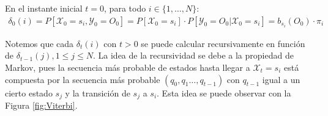 En el instante inicial $t=0$, para todo $i\in\{1,\dots,N\}$:
\[
\begin{aligned}
    \delta_0(i)=P[\mathcal{X}_0=s_i,\mathcal{Y}_0=O_0]=P[\mathcal{X}_0=s_i]\cdot P[\mathcal{Y}_0=O_0|\mathcal{X}_0=s_i]=b_{s_i}(O_0)\cdot\pi_i
\end{aligned}
\]

Notemos que cada $\delta_t(i)$ con $t>0$ se puede calcular recursivamente en función de $\delta_{t-1}(j),1\leq j\leq N$. La idea de la recursividad se debe a la propiedad de Markov, pues la secuencia más probable de estados hasta llegar a $\mathcal{X}_t=s_i$ está compuesta por la secuencia más probable $(q_0,q_1\dots,q_{t-1})$ con $q_{t-1}$ igual a un cierto estado $s_j$ y la transición de $s_j$ a $s_i$. Esta idea se puede observar con la Figura \ref{fig:Viterbi}. 

